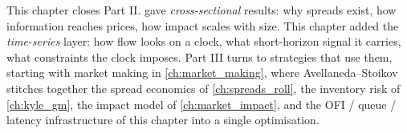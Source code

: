 \bigskip

This chapter closes Part II. 
gave \emph{cross-sectional} results: why spreads exist, how
information reaches prices, how impact scales with size. This
chapter added the \emph{time-series} layer: how flow looks on a
clock, what short-horizon signal it carries, what constraints the
clock imposes. Part III turns to strategies that use them,
starting with market making in \cref{ch:market_making}, where
Avellaneda--Stoikov stitches together the spread economics of
\cref{ch:spreads_roll}, the inventory risk of \cref{ch:kyle_gm},
the impact model of \cref{ch:market_impact}, and the OFI / queue
/ latency infrastructure of this chapter
into a single optimisation.
